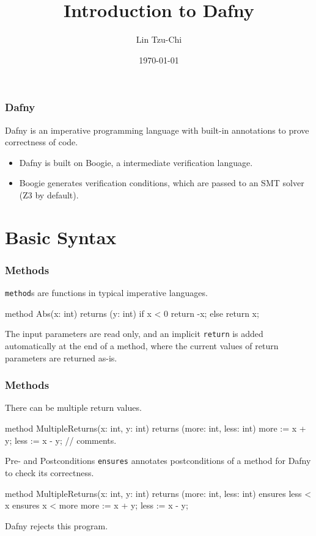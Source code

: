 \documentclass[10pt, compress]{beamer}
\title{Introduction to Dafny}
\subtitle{}
\date{\today}
\author{Lin Tzu-Chi}
\begin{document}
\maketitle

\begin{frame}[fragile]
  \frametitle{Dafny}

  Dafny is an imperative programming language with built-in annotations to prove correctness of code.
  \begin{itemize}
  \item Dafny is built on Boogie, a intermediate verification language.
  \item Boogie generates verification conditions, which are passed to an SMT solver (Z3 by default).
  \end{itemize}
  
\end{frame}

\section{Basic Syntax}

\begin{frame}[fragile]
  \frametitle{Methods}
  
  \verb|method|s are functions in typical imperative languages.
  
  \begin{verbnobox}[\footnotesize]
method Abs(x: int) returns (y: int)
{
   if x < 0
     { return -x; }
   else
     { return x; }
}
  \end{verbnobox}
  The input parameters are read only, and an implicit \verb|return| is added automatically at the end of a method, where the current values of return parameters are returned as-is.
\end{frame}

\begin{frame}[fragile]
  \frametitle{Methods}
  
  There can be multiple return values.
  \begin{verbnobox}[\footnotesize]
method MultipleReturns(x: int, y: int)
returns (more: int, less: int)
{
   more := x + y;
   less := x - y;
   // comments.
}
  \end{verbnobox}
\end{frame}

\begin{frame}[fragile]{Pre- and Postconditions}
  \verb|ensures| annotates postconditions of a method for Dafny to check its correctness. 
  \begin{verbnobox}[\footnotesize]
method MultipleReturns(x: int, y: int)
returns (more: int, less: int)
   ensures less < x
   ensures x < more
{
   more := x + y;
   less := x - y;
}
  \end{verbnobox}	
  
Dafny rejects this program.
\end{frame}
\end{document}
